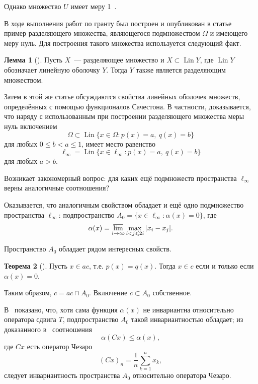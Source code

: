 \documentclass[a4paper,openbib]{report}
\renewcommand{\leq}{\leqslant}
\theoremstyle{definition}
\newtheorem{lemma}{Лемма}%
\newtheorem{theorem}[lemma]{Теорема}
\begin{document}
Однако множество $U$ имеет меру 1~\cite{semenov2010characteristic}.

В ходе выполнения работ по гранту был построен и опубликован в статье~\cite{avdeev2021vestnik} пример разделяющего множества,
являющегося подмножеством $\Omega$ и имеющего меру нуль.
Для построения такого множества используется следующий факт.

\begin{lemma}[{\cite[\S 3, замечание 6]{Semenov2014geomprops}}]
	Пусть $X$~--- разделяющее множество и $X \subset \operatorname{Lin} Y$,
	где $\operatorname{Lin} Y$ обозначает линейную оболочку $Y$.
	Тогда $Y$ также является разделяющим множеством.
\end{lemma}

Затем в этой же статье обсуждаются свойства линейных оболочек множеств, определённых с помощью функционалов Сачестона.
В частности, доказывается,
что наряду с использованным при построении разделяющего множества меры нуль включением
\begin{equation}
	\Omega \subset \operatorname{Lin}\{x\in\Omega : p(x) = a,~ q(x) = b\}
\end{equation}
для любых $0\leq b < a \leq 1$,
имеет место равенство
\begin{equation}
	\ell_\infty = \operatorname{Lin}\{x\in\ell_\infty : p(x) = a,~ q(x) = b\}
\end{equation}
для любых $a>b$.

Возникает закономерный вопрос: для каких ещё подмножеств пространства $\ell_\infty$
верны аналогичные соотношения?

Оказывается, что аналогичным свойством обладает и ещё одно подмножество пространства $\ell_\infty$: подпространство
$A_0 = \{ x \in \ell_\infty : \alpha(x) =0 \}$,
где~\cite{our-vzms-2018}
\begin{equation*}
	\alpha(x) = \varlimsup_{i\to\infty} \max_{i<j\leqslant 2i} |x_i - x_j|
	.
\end{equation*}

Пространство $A_0$ обладает рядом интересных свойств.


\begin{theorem}[{\cite[следствие 2]{our-mz2019ac0}}]
	\label{thm:alpha_c_ac_c}
	Пусть $x\in ac$, т.е. $p(x) = q(x)$.
	Тогда $x\in c$ если и только если $\alpha(x) = 0$.
\end{theorem}
Таким образом, $c = ac \cap A_0$.
Включение $c\subset A_0$ собственное.

В~\cite{our-ped-2018-alpha-Tx} показано, что, хотя сама функция $\alpha(x)$ не инвариантна относительно оператора сдвига $T$,
подпространство $A_0$ такой инвариантностью обладает;
из доказанного в~\cite{SSUZ2} соотношения
\begin{equation}
	\alpha(Cx) \leq \alpha(x)
	,
\end{equation}
где $Cx$ есть оператор Чезаро
\begin{equation}
	(Cx)_n = \frac{1}{n} \sum_{k=1}^n x_k
	,
\end{equation}
следует инвариантность пространства $A_0$ относительно оператора Чезаро.
\end{document}
